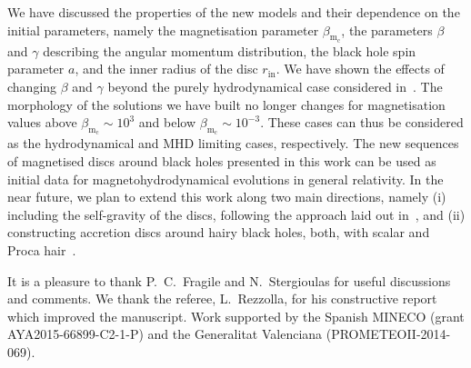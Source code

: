 \documentclass[referee]{aa}
\begin{document}
We have discussed the properties of the new models and their dependence on the initial parameters, namely the magnetisation parameter $\beta_{\mathrm{m}_{\mathrm{c}}}$, the parameters $\beta$ and $\gamma$ describing the angular momentum distribution, the black hole spin parameter $a$, and the inner radius of the disc $r_{\mathrm{in}}$. We have shown the effects of changing $\beta$ and $\gamma$ beyond the purely hydrodynamical case considered in~\citet{Qian:2009}. The morphology of the solutions we have built no longer changes for magnetisation values above $\beta_{\mathrm{m}_{\mathrm{c}}} \sim 10^{3}$ and below $\beta_{\mathrm{m}_{\mathrm{c}}} \sim 10^{-3}$. These cases can thus be considered as the hydrodynamical and MHD limiting cases, respectively. The new sequences of magnetised discs around black holes presented in this work can be used as initial data for magnetohydrodynamical evolutions in general relativity. In the near future, we plan to extend this work along two main directions, namely (i) including the self-gravity of the discs, following the approach laid out in~\citet{Stergioulas:2011}, and (ii) constructing accretion discs around hairy black holes, both, with scalar and Proca hair~\citep{Herdeiro:2014,Herdeiro:2016}.

\begin{acknowledgements}
It is a pleasure to thank P.~C.~Fragile and N.~Stergioulas for useful discussions and comments. We thank the referee, L.~Rezzolla, for his constructive report which improved the manuscript. Work supported by the Spanish MINECO (grant AYA2015-66899-C2-1-P) and the Generalitat Valenciana (PROMETEOII-2014-069).
\end{acknowledgements}



\end{document}
